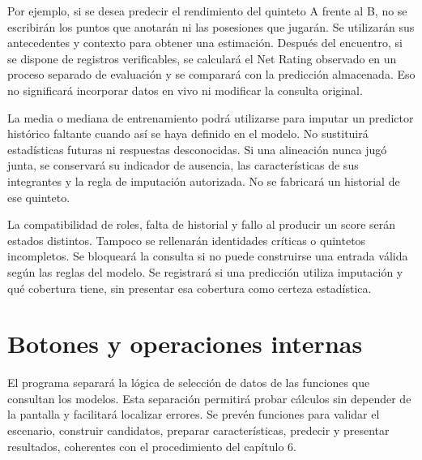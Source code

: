 Por ejemplo, si se desea predecir el rendimiento del quinteto A frente al B, no se escribirán los puntos que anotarán ni las posesiones que jugarán. Se utilizarán sus antecedentes y contexto para obtener una estimación. Después del encuentro, si se dispone de registros verificables, se calculará el Net Rating observado en un proceso separado de evaluación y se comparará con la predicción almacenada. Eso no significará incorporar datos en vivo ni modificar la consulta original.

La media o mediana de entrenamiento podrá utilizarse para imputar un predictor histórico faltante cuando así se haya definido en el modelo. No sustituirá estadísticas futuras ni respuestas desconocidas. Si una alineación nunca jugó junta, se conservará su indicador de ausencia, las características de sus integrantes y la regla de imputación autorizada. No se fabricará un historial de ese quinteto.

La compatibilidad de roles, falta de historial y fallo al producir un score serán estados distintos. Tampoco se rellenarán identidades críticas o quintetos incompletos. Se bloqueará la consulta si no puede construirse una entrada válida según las reglas del modelo. Se registrará si una predicción utiliza imputación y qué cobertura tiene, sin presentar esa cobertura como certeza estadística.

\section{Botones y operaciones internas}
\label{sec:botones-pruebas}
El programa separará la lógica de selección de datos de las funciones que consultan los modelos. Esta separación permitirá probar cálculos sin depender de la pantalla y facilitará localizar errores. Se prevén funciones para validar el escenario, construir candidatos, preparar características, predecir y presentar resultados, coherentes con el procedimiento del capítulo 6.

